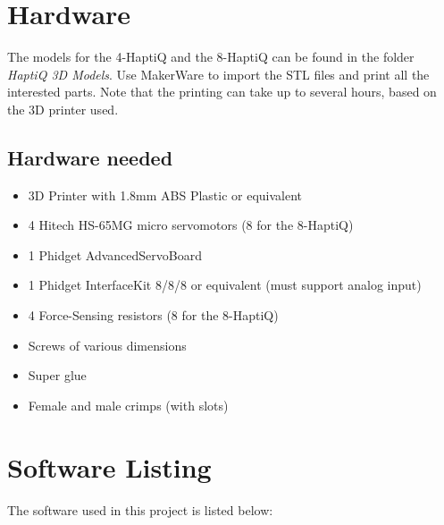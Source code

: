 \documentclass[a4paper]{article}
\begin{document}
\section{Hardware}

The models for the 4-HaptiQ and the 8-HaptiQ can be found in the folder \textit{HaptiQ 3D Models}. Use MakerWare to import the STL files and print all the interested parts. Note that the printing can take up to several hours, based on the 3D printer used. 

\subsection{Hardware needed}

\begin{itemize}
	\item 3D Printer with 1.8mm ABS Plastic or equivalent
    \item 4 Hitech HS-65MG micro servomotors (8 for the 8-HaptiQ)
    \item 1 Phidget AdvancedServoBoard
    \item 1 Phidget InterfaceKit 8/8/8 or equivalent (must support analog input)
    \item 4 Force-Sensing resistors (8 for the 8-HaptiQ)
    \item Screws of various dimensions 
    \item Super glue
    \item Female and male crimps (with slots)
\end{itemize}

\section{Software Listing}

The software used in this project is listed below:
\end{document}
